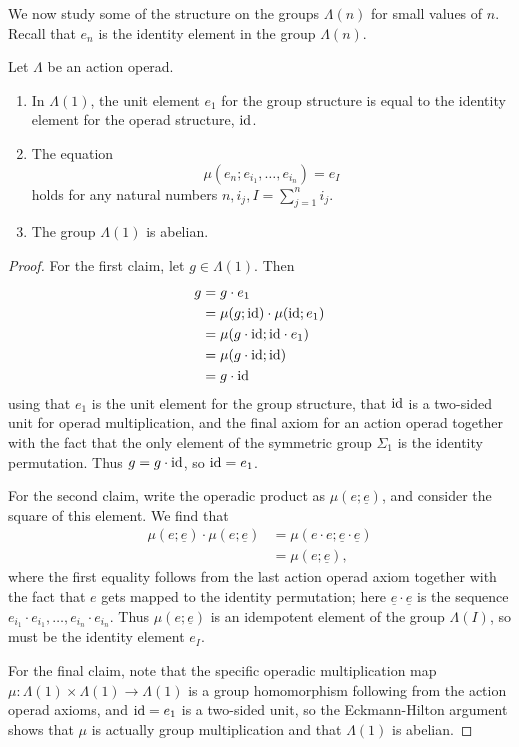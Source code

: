 We now study some of the structure on the groups $\Lambda(n)$ for small values of $n$. Recall that $e_{n}$ is the identity element in the group $\Lambda(n)$.

\begin{lem}\label{calclem}
Let $\Lambda$ be an action operad.
\begin{enumerate}
\item In $\Lambda(1)$, the unit element $e_{1}$ for the group structure is equal to the identity element for the operad structure, $\textrm{id}$.
\item The equation
  \[
    \mu(e_{n}; e_{i_{1}}, \ldots, e_{i_{n}}) = e_{I}
  \]
holds for any natural numbers $n, i_{j}, I = \sum_{j=1}^n i_{j}$.
\item The group $\Lambda(1)$ is abelian.
\end{enumerate}
\end{lem}
\begin{proof}
For the first claim, let $g \in \Lambda(1)$. Then
  \begin{align*}
    g & = g \cdot e_{1} \\
    &= \mu(g; \textrm{id}) \cdot \mu(\textrm{id}; e_{1}) \\
    &= \mu(g \cdot \textrm{id}; \textrm{id} \cdot e_{1}) \\
    &= \mu(g \cdot \textrm{id}; \textrm{id}) \\
    &= g \cdot \textrm{id}
  \end{align*}
using that $e_{1}$ is the unit element for the group structure, that $\textrm{id}$ is a two-sided unit for operad multiplication, and the final axiom for an action operad together with the fact that the only element of the symmetric group $\Sigma_{1}$ is the identity permutation. Thus $g = g \cdot \textrm{id}$, so $\textrm{id} = e_{1}$.

For the second claim, write the operadic product as $\mu(e; \underline{e})$, and consider the square of this element. We find that
  \begin{align*}
    \mu(e; \underline{e}) \cdot \mu(e; \underline{e}) & = \mu(e \cdot e; \underline{e} \cdot \underline{e}) \\
    &= \mu(e; \underline{e}),
  \end{align*}
where the first equality follows from the last action operad axiom together with the fact that $e$ gets mapped to the identity permutation; here $\underline{e} \cdot \underline{e}$ is the sequence $e_{i_{1}} \cdot e_{i_{1}}, \ldots, e_{i_{n}} \cdot e_{i_{n}}$. Thus $\mu(e; \underline{e})$ is an idempotent element of the group $\Lambda(I)$, so must be the identity element $e_{I}$.

For the final claim, note that the specific operadic multiplication map $\mu \colon \Lambda(1) \times \Lambda(1) \rightarrow \Lambda(1)$ is a group homomorphism following from the action operad axioms, and $\textrm{id} = e_{1}$ is a two-sided unit, so the Eckmann-Hilton argument shows that $\mu$ is actually group multiplication and that $\Lambda(1)$ is abelian.
\end{proof}

